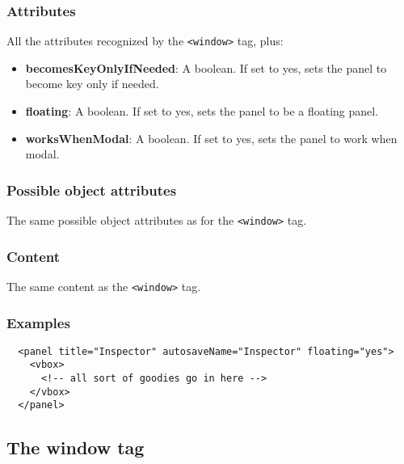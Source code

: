 \subsubsection{Attributes}
All the attributes recognized by the \texttt{<window>} tag, plus:
\begin{itemize}
\item {\bf becomesKeyOnlyIfNeeded}: A boolean.  If set to yes, sets the panel
to become key only if needed.
\item {\bf floating}: A boolean.  If set to yes, sets the panel
to be a floating panel.
\item {\bf worksWhenModal}: A boolean.  If set to yes, sets the panel
to work when modal.
\end{itemize}

\subsubsection{Possible object attributes}
The same possible object attributes as for the \texttt{<window>} tag.

\subsubsection{Content}
The same content as the \texttt{<window>} tag.

\subsubsection{Examples}
\begin{verbatim}
  <panel title="Inspector" autosaveName="Inspector" floating="yes">
    <vbox>
      <!-- all sort of goodies go in here -->
    </vbox>
  </panel>
\end{verbatim}

\subsection{The window tag}
